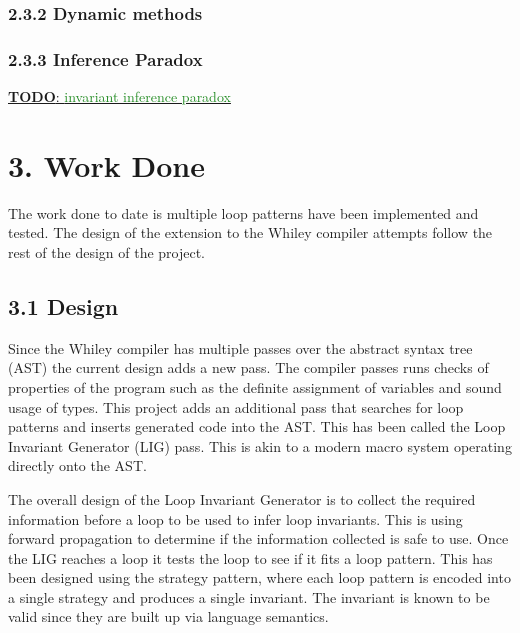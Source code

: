 \documentclass[11pt, a4paper, twoside, openright]{report}
\newcommand{\todo}[1]{\huge{\underline{\textbf{\textcolor{RubineRed}{TODO}}: \textcolor{ForestGreen}{#1}}}\normalsize }
\begin{document}
\subsubsection*{2.3.2 Dynamic methods}

\cite{infer-dynamic}
\cite{infer-postconditions}

\subsubsection*{2.3.3 Inference Paradox}

\todo{invariant inference paradox}
\cite{infer-postconditions}


\section*{3. Work Done}

The work done to date is multiple loop patterns have been implemented and
tested. The design of the extension to the Whiley compiler attempts follow
the rest of the design of the project.

\subsection*{3.1 Design}

Since the Whiley compiler has multiple passes over the abstract syntax tree
(AST)
the current design adds a new pass. The compiler passes runs checks of properties
of the program such as the definite assignment of variables and sound usage of
types. This project adds an additional pass that searches for loop patterns and
inserts generated code into the AST.
This has been called the Loop Invariant Generator (LIG) pass.
This is akin to a modern macro system operating directly onto the AST.

The overall design of the Loop Invariant Generator is to collect the required
information before a loop to be used to infer loop invariants.
This is using forward propagation to determine if the
information collected is safe to use. Once the LIG reaches a loop
it tests the loop to see if it fits a loop pattern. This has been
designed using the strategy pattern, where each loop pattern is encoded
into a single strategy and produces a single invariant.
The invariant is known to be valid since they are built up via language
semantics.
\end{document}
